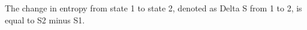 The change in entropy from state 1 to state 2, denoted as Delta S from 1 to 2, is equal to S2 minus S1.